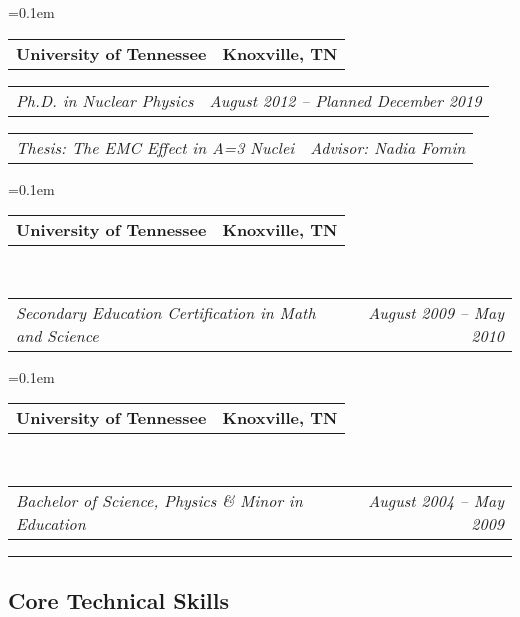 \documentclass[10pt,letterpaper]{article}
\makeatletter
\newcommand{\headerrow}[2]
{\begin{tabular*}{\linewidth}{l@{\extracolsep{\fill}}r}
	#1 &
	#2 \\
\end{tabular*}}
\makeatother
\begin{document}
\begin{itemize*}
	\parskip=0.1em
	
	\item 
	\headerrow
	{\textbf{University of Tennessee}}
	{\textbf{Knoxville, TN}}
	
	\headerrow
	{\emph{Ph.D. in Nuclear Physics}}
	{\emph{August 2012 -- Planned December 2019}}
		\headerrow
	{\emph{Thesis: The EMC Effect in A=3 Nuclei}}
	{\emph{Advisor: Nadia Fomin}}
	
	
	\parskip=0.1em
	
	\item 
	\headerrow
	{\textbf{University of Tennessee}}
	{\textbf{Knoxville, TN}}
	\\
	\headerrow
	{\emph{Secondary Education Certification in Math and Science}}
	{\emph{August 2009 -- May 2010}}
	
	
	\parskip=0.1em
	
	\item 
	\headerrow
	{\textbf{University of Tennessee}}
	{\textbf{Knoxville, TN}}
	\\
	\headerrow
	{\emph{Bachelor of Science, Physics \& Minor in Education }}
	{\emph{August 2004 -- May 2009}}
	
	
\end{itemize*}


\hrule
\vspace{-0.4em}
\subsection*{Core Technical Skills}
\end{document}
